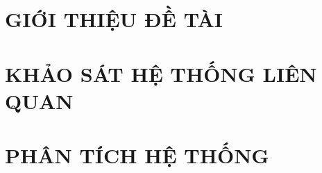 \documentclass[a4paper,12pt,oneside]{report}
\begin{document}
\vspace{1cm} %
\cleardoublepage %

\chapter{GIỚI THIỆU ĐỀ TÀI}
\renewcommand*{\theHsection}{\theHchapter.\the\value{section}}


\chapter{KHẢO SÁT HỆ THỐNG LIÊN QUAN}
\renewcommand*{\theHsection}{\theHchapter.\the\value{section}}


\chapter{PHÂN TÍCH HỆ THỐNG}
\renewcommand*{\theHsection}{\theHchapter.\the\value{section}}


% 

% 

% 
\end{document}
